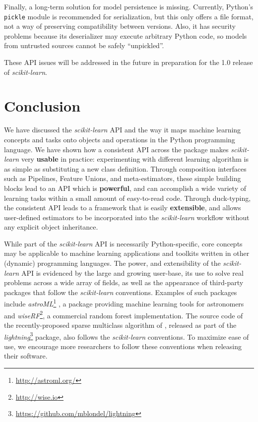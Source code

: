 \documentclass{llncs}
\newcommand{\sklearn}{\textit{scikit-learn}\xspace}
\begin{document}
Finally, a long-term solution for model persistence is missing.
Currently, Python's \texttt{pickle} module is recommended for serialization,
but this only offers a file format,
not a way of preserving compatibility between versions.
Also, it has security problems because its deserializer
may execute arbitrary Python code,
so models from untrusted sources cannot be safely ``unpickled''.

These API issues will be addressed in the future in preparation for
the 1.0 release of \sklearn.


\section{Conclusion}
\label{sec:conclusions}

We have discussed the \sklearn API
and the way it maps machine learning concepts and tasks
onto objects and operations in the Python programming language.
We have shown how a consistent API across the package makes \sklearn
very \textbf{usable} in practice: experimenting with different learning
algorithm is as simple as substituting a new class definition.
Through composition interfaces such as Pipelines, Feature Unions,
and meta-estimators, these simple building blocks lead to an API which is
\textbf{powerful}, and can accomplish a wide variety of learning tasks
within a small amount of easy-to-read code.
Through duck-typing, the consistent API leads to a framework that is
easily \textbf{extensible}, and allows user-defined estimators to be
incorporated into the \sklearn workflow without any explicit object
inheritance.

While part of the \sklearn API is necessarily Python-specific,
core concepts may be applicable to
machine learning applications and toolkits
written in other (dynamic) programming languages.
The power, and extensibility of the \sklearn API is evidenced
by the large and growing user-base, its use to solve real
problems across a wide array of fields,
as well as the appearance of third-party packages
that follow the \sklearn conventions. Examples of such packages include
\textit{astroML}\footnote{\url{http://astroml.org/}}
\citep{vanderplas2012astroML}, a package providing
machine learning tools for astronomers and
\textit{wiseRF}\footnote{\url{http://wise.io}}, a commercial random forest
implementation. The source code of
the recently-proposed sparse multiclass
algorithm of \citet{mblondel-mlj2013}, released as
part of the
\textit{lightning}\footnote{\url{https://github.com/mblondel/lightning}}
package, also follows the \sklearn conventions.
To maximize ease of use, we encourage more researchers
to follow these conventions when releasing their software.
\end{document}
